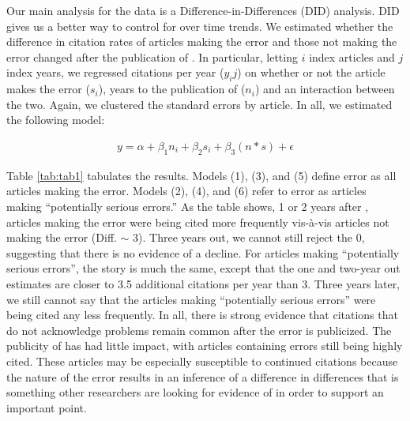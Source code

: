 \documentclass[12pt, letterpaper]{article}
\begin{document}
Our main analysis for the \citeauthor{nieuwenhuis2011} data is a Difference-in-Differences (DID) analysis. DID gives us a better way to control for over time trends. We estimated whether the difference in citation rates of articles making the error and those not making the error changed after the publication of \citet{nieuwenhuis2011}. In particular, letting $i$ index articles and $j$ index years, we regressed citations per year ($y_ij$) on whether or not the article makes the error ($s_i$), years to the publication of \citeauthor{nieuwenhuis2011} ($n_i$) and an interaction between the two. Again, we clustered the standard errors by article. In all, we estimated the following model:

\begin{align}
\label{eqn:eqn2}
y = \alpha + \beta_1 n_i + \beta_2 s_i + \beta_3 (n*s) + \epsilon
\end{align}

Table \ref{tab:tab1} tabulates the results. Models (1), (3), and (5) define error as all articles making the error. Models (2), (4), and (6) refer to error as articles making ``potentially serious errors.'' As the table shows, 1 or 2 years after \citet{nieuwenhuis2011}, articles making the error were being cited more frequently vis-\`a-vis articles not making the error (Diff. $\sim$ 3). Three years out, we cannot still reject the 0, suggesting that there is no evidence of a decline. For articles making ``potentially serious errors'', the story is much the same, except that the one and two-year out estimates are closer to 3.5 additional citations per year than 3. Three years later, we still cannot say that the articles making ``potentially serious errors'' were being cited any less frequently.  In all, there is strong evidence that citations that do not acknowledge problems remain common after the error is publicized. The publicity of \citeauthor{nieuwenhuis2011} has had little impact, with articles containing errors still being highly cited. These articles may be especially susceptible to continued citations because the nature of the error results in an inference of a difference in differences that is something other researchers are looking for evidence of in order to support an important point.




\clearpage



\clearpage
\appendix
\renewcommand{\thesection}{SI \arabic{section}}
\renewcommand\thetable{\thesection.\arabic{table}}
\renewcommand\thefigure{\thesection.\arabic{figure}}
\setcounter{figure}{0}
\setcounter{section}{0}
\setcounter{table}{0}
\end{document}

